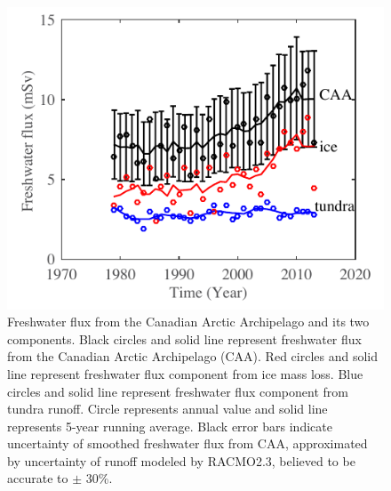 \begin{figure}
	\centering
	\includegraphics{figs_app/FigS12.pdf}
	\caption[Freshwater flux from the Canadian Arctic Archipelago and its two components.]{Freshwater flux from the Canadian Arctic Archipelago and its two components.  Black circles and solid line represent freshwater flux from the Canadian Arctic Archipelago (CAA).  Red circles and solid line represent freshwater flux component from ice mass loss.  Blue circles and solid line represent freshwater flux component from tundra runoff.  Circle represents annual value and solid line represents 5-year running average.  Black error bars indicate uncertainty of smoothed freshwater flux from CAA, approximated by uncertainty of runoff modeled by RACMO2.3, believed to be accurate to $\pm$ 30\%\cite[]{lenaerts2013irreversible}.}
	\label{fig:SI4_fig12}
\end{figure}